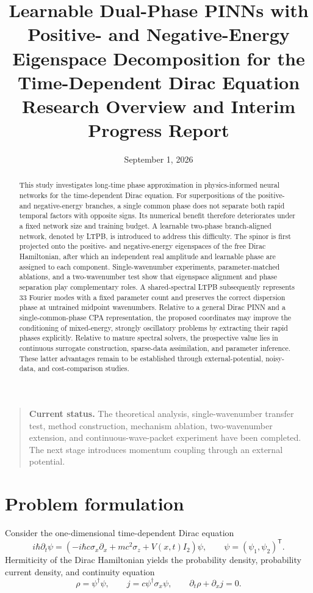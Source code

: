 \documentclass[a4paper,11pt]{article}
\title{Learnable Dual-Phase PINNs with Positive- and Negative-Energy
Eigenspace Decomposition for the Time-Dependent Dirac Equation\\
\large Research Overview and Interim Progress Report}
\author{}
\date{September 1, 2026}
\begin{document}
\maketitle

\begin{quote}
\noindent\textbf{Current status.}
The theoretical analysis, single-wavenumber transfer test, method construction,
mechanism ablation, two-wavenumber extension, and continuous-wave-packet
experiment have been completed. The next stage introduces momentum coupling
through an external potential.
\end{quote}

\begin{abstract}
This study investigates long-time phase approximation in physics-informed
neural networks for the time-dependent Dirac equation. For superpositions of
the positive- and negative-energy branches, a single common phase does not
separate both rapid temporal factors with opposite signs. Its numerical benefit
therefore deteriorates under a fixed network size and training budget. A
learnable two-phase branch-aligned network, denoted by LTPB, is introduced to
address this difficulty. The spinor is first projected onto the positive- and
negative-energy eigenspaces of the free Dirac Hamiltonian, after which an
independent real amplitude and learnable phase are assigned to each component.
Single-wavenumber experiments, parameter-matched ablations, and a
two-wavenumber test show that eigenspace alignment and phase separation play
complementary roles. A shared-spectral LTPB subsequently represents 33 Fourier
modes with a fixed parameter count and preserves the correct dispersion phase
at untrained midpoint wavenumbers. Relative to a general Dirac PINN and a
single-common-phase CPA representation, the proposed coordinates may improve
the conditioning of mixed-energy, strongly oscillatory problems by extracting
their rapid phases explicitly. Relative to mature spectral solvers, the
prospective value lies in continuous surrogate construction, sparse-data
assimilation, and parameter inference. These latter advantages remain to be
established through external-potential, noisy-data, and cost-comparison studies.
\end{abstract}

\section{Problem formulation}

Consider the one-dimensional time-dependent Dirac equation
\begin{equation}
i\hbar\partial_t\psi=
\left(-i\hbar c\sigma_x\partial_x+mc^2\sigma_z+V(x,t)I_2\right)\psi,
\qquad
\psi=(\psi_1,\psi_2)^{\mathsf T}.
\end{equation}
Hermiticity of the Dirac Hamiltonian yields the probability density, probability
current density, and continuity equation
\begin{equation}
\rho=\psi^\dagger\psi,
\qquad
j=c\psi^\dagger\sigma_x\psi,
\qquad
\partial_t\rho+\partial_xj=0.
\end{equation}
\end{document}

